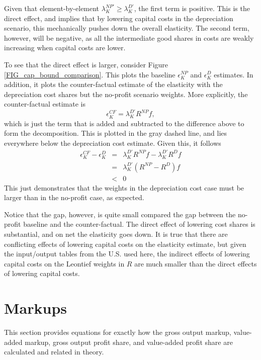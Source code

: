 \documentclass[11pt]{article}
\begin{document}
Given that element-by-element $\lambda_K^{NP'} \geq \lambda_K^{D'}$, the first term is positive. This is the direct effect, and implies that by lowering capital costs in the depreciation scenario, this mechanically pushes down the overall elasticity. The second term, however, will be negative, as all the intermediate good shares in costs are weakly increasing when capital costs are lower.

To see that the direct effect is larger, consider Figure \ref{FIG_cap_bound_comparison}. This plots the baseline $\epsilon_K^{NP}$ and $\epsilon_K^D$ estimates. In addition, it plots the counter-factual estimate of the elasticity with the depreciation cost shares but the no-profit scenario weights. More explicitly, the counter-factual estimate is
\begin{equation*}
	\epsilon_K^{CF} = \lambda_K^{D'} R^{NP} f,
\end{equation*}
which is just the term that is added and subtracted to the difference above to form the decomposition. This is plotted in the gray dashed line, and lies everywhere below the depreciation cost estimate. Given this, it follows
\begin{eqnarray*}
	\epsilon_K^{CF} - \epsilon_K^{D} &=& \lambda_K^{D'} R^{NP} f - \lambda_K^{D'} R^{D} f \\
	                                 &=& \lambda_K^{D'} \left(R^{NP} - R^D \right) f \\
	                                 &<& 0
\end{eqnarray*}
This just demonstrates that the weights in the depreciation cost case must be larger than in the no-profit case, as expected. 

Notice that the gap, however, is quite small compared the gap between the no-profit baseline and the counter-factual. The direct effect of lowering cost shares is substantial, and on net the elasticity goes down. It is true that there are conflicting effects of lowering capital costs on the elasticity estimate, but given the input/output tables from the U.S. used here, the indirect effects of lowering capital costs on the Leontief weights in $R$ are much smaller than the direct effects of lowering capital costs.

\section{Markups}
This section provides equations for exactly how the gross output markup, value-added markup, gross output profit share, and value-added profit share are calculated and related in theory.
\end{document}
